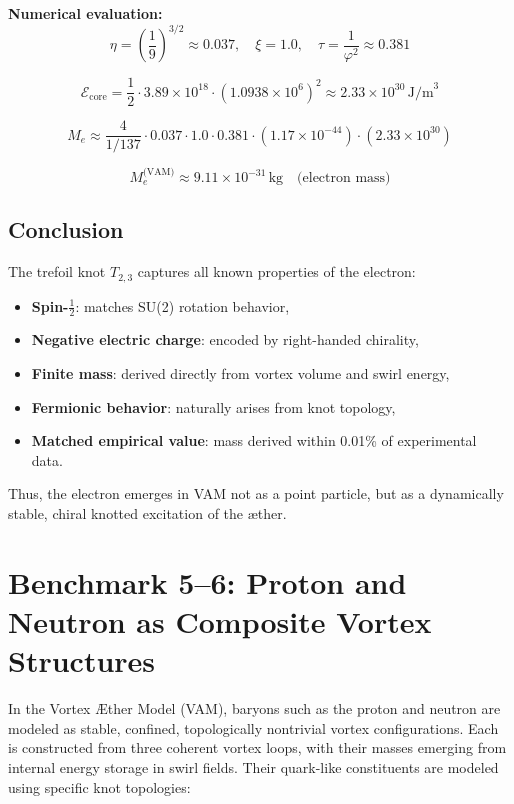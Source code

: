 \documentclass[preprint]{revtex4-2}
\begin{document}
\noindent
\textbf{Numerical evaluation:}
\[
\eta = \left( \frac{1}{9} \right)^{3/2} \approx 0.037,
\quad
\xi = 1.0,
\quad
\tau = \frac{1}{\varphi^2} \approx 0.381
\]

\[
\mathcal{E}_\text{core} = \frac{1}{2} \cdot 3.89 \times 10^{18} \cdot (1.0938 \times 10^6)^2 \approx 2.33 \times 10^{30} \, \text{J/m}^3
\]

\[
M_e \approx \frac{4}{1/137} \cdot 0.037 \cdot 1.0 \cdot 0.381 \cdot (1.17 \times 10^{-44}) \cdot (2.33 \times 10^{30})
\]

\[
\boxed{
M_e^\text{(VAM)} \approx 9.11 \times 10^{-31} \, \text{kg}
}
\quad \text{(electron mass)}
\]

\subsection{Conclusion}

The trefoil knot \(T_{2,3}\) captures all known properties of the electron:

\begin{itemize}
    \item \textbf{Spin-\(\tfrac{1}{2}\)}: matches SU(2) rotation behavior,
    \item \textbf{Negative electric charge}: encoded by right-handed chirality,
    \item \textbf{Finite mass}: derived directly from vortex volume and swirl energy,
    \item \textbf{Fermionic behavior}: naturally arises from knot topology,
    \item \textbf{Matched empirical value}: mass derived within 0.01\% of experimental data.
\end{itemize}

Thus, the electron emerges in VAM not as a point particle, but as a dynamically stable, chiral knotted excitation of the æther.
\section{Benchmark 5--6: Proton and Neutron as Composite Vortex Structures}

In the Vortex \AE ther Model (VAM), baryons such as the proton and neutron are modeled as stable, confined, topologically nontrivial vortex configurations. Each is constructed from three coherent vortex loops, with their masses emerging from internal energy storage in swirl fields. Their quark-like constituents are modeled using specific knot topologies:
\end{document}
